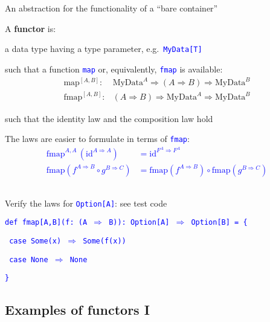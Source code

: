An abstraction for the functionality of a ``bare container'' 

A \textbf{functor} is:

a data type having a type parameter, e.g.\ \texttt{\textcolor{blue}{\footnotesize{}MyData{[}T{]}}}{\footnotesize\par}

such that a function \texttt{\textcolor{blue}{\footnotesize{}map}}
or, equivalently, \texttt{\textcolor{blue}{\footnotesize{}fmap}} is
available:{\footnotesize{}
\begin{align*}
\text{map}^{[A,B]}:\  & \text{MyData}^{A}\Rightarrow\left(A\Rightarrow B\right)\Rightarrow\text{MyData}^{B}\\
\text{fmap}^{[A,B]}: & \left(A\Rightarrow B\right)\Rightarrow\text{MyData}^{A}\Rightarrow\text{MyData}^{B}
\end{align*}
}{\footnotesize\par}

such that the identity law and the composition law hold

The laws are easier to formulate in terms of \texttt{\textcolor{blue}{\footnotesize{}fmap}}:\texttt{\textcolor{blue}{\footnotesize{}
\begin{align*}
\text{fmap}^{A,A}\,(\text{id}^{A\Rightarrow A}) & =\text{id}^{F^{A}\Rightarrow F^{A}}\\
\text{fmap}(f^{A\Rightarrow B}\circ g^{B\Rightarrow C}) & =\text{fmap}(f^{A\Rightarrow B})\circ\text{fmap}(g^{B\Rightarrow C})
\end{align*}
}}{\footnotesize\par}

Verify the laws for \texttt{\textcolor{blue}{\footnotesize{}Option{[}A{]}}}:
see test code

\texttt{\textcolor{blue}{\footnotesize{}def fmap{[}A,B{]}(f: (A $\Rightarrow$
B)): Option{[}A{]} $\Rightarrow$ Option{[}B{]} = \{}}{\footnotesize\par}

\texttt{\textcolor{blue}{\footnotesize{}  case Some(x) $\Rightarrow$
Some(f(x))}}{\footnotesize\par}

\texttt{\textcolor{blue}{\footnotesize{}  case None $\Rightarrow$
None}}{\footnotesize\par}

\texttt{\textcolor{blue}{\footnotesize{}\}}}{\footnotesize\par}


\subsection{Examples of functors I}

